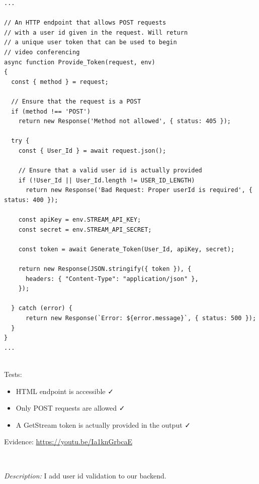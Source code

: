 \begin{verbatim}
...

// An HTTP endpoint that allows POST requests
// with a user id given in the request. Will return
// a unique user token that can be used to begin
// video conferencing
async function Provide_Token(request, env)
{
  const { method } = request;

  // Ensure that the request is a POST
  if (method !== 'POST')
    return new Response('Method not allowed', { status: 405 });

  try {
    const { User_Id } = await request.json();

    // Ensure that a valid user id is actually provided
    if (!User_Id || User_Id.length != USER_ID_LENGTH)
      return new Response('Bad Request: Proper userId is required', { status: 400 });

    const apiKey = env.STREAM_API_KEY;
    const secret = env.STREAM_API_SECRET;

    const token = await Generate_Token(User_Id, apiKey, secret);

    return new Response(JSON.stringify({ token }), {
      headers: { "Content-Type": "application/json" },
    });

  } catch (error) {
      return new Response(`Error: ${error.message}`, { status: 500 });
  }
}
...
\end{verbatim}

{\color{gray} \hrulefill} \\ \vspace{0.2cm}
{\sffamily Tests:}

\begin{itemize}
  \item HTML endpoint is accessible \faCheck \\
  \item Only POST requests are allowed \faCheck \\
  \item A GetStream token is actually provided in the output \faCheck
\end{itemize}

{\sffamily Evidence: \url{https://youtu.be/Ia1knGrbcaE}}

{\color{gray} \hrulefill}
\\ \vspace{0.2cm}

\textit{Description:} I add user id validation to our backend.
\\ \vspace{0.2cm}

